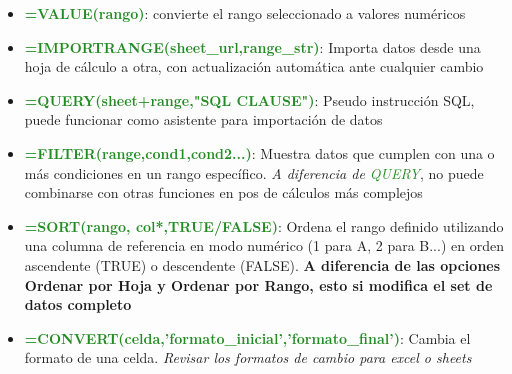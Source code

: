 \begin{itemize}
    \item {\textcolor{ForestGreen}{\textbf{=VALUE(rango)}}: convierte el rango seleccionado a valores numéricos}
    \item {\textcolor{ForestGreen}{\textbf{=IMPORTRANGE(sheet\_url,range\_str)}}: Importa datos desde una hoja de cálculo a otra, con actualización automática ante cualquier cambio}
    \item {\textcolor{ForestGreen}{\textbf{=QUERY(sheet+range,"SQL CLAUSE")}}: Pseudo instrucción SQL, puede funcionar como asistente para importación de datos}
    \item {\textcolor{ForestGreen}{\textbf{=FILTER(range,cond1,cond2...)}}: Muestra datos que cumplen con una o más condiciones en un rango específico. \textit{A diferencia de \textcolor{ForestGreen}{QUERY}}, no puede combinarse con otras funciones en pos de cálculos más complejos}
    \item {\textcolor{ForestGreen}{\textbf{=SORT(rango, col*,TRUE/FALSE)}}: Ordena el rango definido utilizando una columna de referencia en modo numérico (1 para A, 2 para B...) en orden ascendente (TRUE) o descendente (FALSE). \textbf{A diferencia de las opciones Ordenar por Hoja y Ordenar por Rango, esto si modifica el set de datos completo}}
    \item {\textcolor{ForestGreen}{\textbf{=CONVERT(celda,'formato\_inicial','formato\_final')}}: Cambia el formato de una celda. \textit{Revisar los formatos de cambio para excel o sheets}}
\end{itemize}

